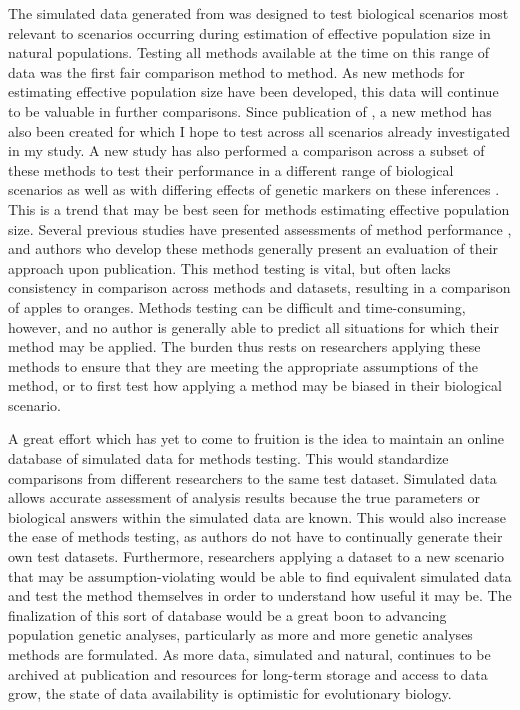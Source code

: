 The simulated data generated from  was designed to test biological scenarios most relevant to scenarios occurring during estimation of effective population size in natural populations. Testing all methods available at the time on this range of data was the first fair comparison method to method. As new methods for estimating effective population size have been developed, this data will continue to be valuable in further comparisons. Since publication of , a new method \citep{Hui:2015} has also been created for which I hope to test across all scenarios already investigated in my study. A new study has also performed a comparison across a subset of these methods to test their performance in a different range of biological scenarios as well as with differing effects of genetic markers on these inferences \citep{Wang:2016}. This is a trend that may be best seen for methods estimating effective population size. Several previous studies have presented assessments of method performance \citep{Ryman:2013, Neel:2013, Holleley:2013, Hoehn:2012, Barker:2011}, and authors who develop these methods generally present an evaluation of their approach upon publication. This method testing is vital, but often lacks consistency in comparison across methods and datasets, resulting in a comparison of apples to oranges. Methods testing can be difficult and time-consuming, however, and no author is generally able to predict all situations for which their method may be applied. The burden thus rests on researchers applying these methods to ensure that they are meeting the appropriate assumptions of the method, or to first test how applying a method may be biased in their biological scenario.

A great effort which has yet to come to fruition is the idea to maintain an online database of simulated data for methods testing. This would standardize comparisons from different researchers to the same test dataset. Simulated data allows accurate assessment of analysis results because the true parameters or biological answers within the simulated data are known. This would also increase the ease of methods testing, as authors do not have to continually generate their own test datasets. Furthermore, researchers applying a dataset to a new scenario that may be assumption-violating would be able to find equivalent simulated data and test the method themselves in order to understand how useful it may be. The finalization of this sort of database would be a great boon to advancing population genetic analyses, particularly as more and more genetic analyses methods are formulated. As more data, simulated and natural, continues to be archived at publication and resources for long-term storage and access to data grow, the state of data availability is optimistic for evolutionary biology.

